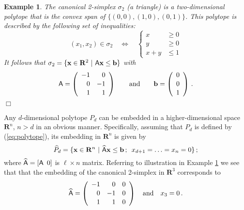 \documentclass[pdf,12pt,relaxed]{SANDreport}
\newtheorem{exam}{Example}
\begin{document}
    \begin{exam}\label{ex:2simplex}
    \emph{
    The canonical 2-simplex $\sigma_2$ (a triangle) is a two-dimensional polytope that is the convex span of $\{(0,0), (1,0), (0,1)\}$.  This polytope is described by the following set of inequalities:
    $$
    (x_1,x_2) \in \sigma_2 \quad\Leftrightarrow\quad
    \left\{\begin{array}{rl} x & \ge 0 \\[0.25ex] y& \ge 0 \\[0.25ex] x+y & \le  1 \end{array}\right. 
    $$
    It follows that
    $
    \sigma_2 = \{{\bf x}\in {\bf R}^2 \,\,|\,\, {\sf A}{\bf x} \le {\bf b} \}
    $
    with
    $$
    {\sf A} = \left(\begin{array}{rr} -1&0 \\[0.25ex] 0& -1\\[0.25ex] 1& 1 \end{array}\right)
    \qquad\mbox{and}\qquad
    {\bf b} = \left(\begin{array}{c} 0\\[0.25ex] 0 \\[0.25ex] 1\end{array}\right) \,.
    $$
    }%
    \hfill$\Box$
    \end{exam}
    
       
     Any $d$-dimensional polytope $P_d$ can be embedded in a higher-dimensional space $\mathbf{R}^n$, $n>d$ in an obvious manner. Specifically, assuming that $P_d$ is defined by (\ref{eq:polytope}), its embedding in $\mathbf{R}^n$ is given by
    \begin{equation}\label{eq:polytope-ext}
    \widehat{P}_d = \{ {\bf x}\in{\mathbf R}^n\,\,|\,\, \widehat{\sf A}{\bf x} \le  {\bf b}\,;\,\,\,  x_{d+1} =\ldots=x_n = 0 \}\,;
    \end{equation}
    where $\widehat{\sf A} = \left[{\sf A} \,\,\, 0\right]$ is $\ell\times n$ matrix. Referring to illustration in Example \ref{ex:2simplex} we see that that the embedding of the canonical 2-simplex in $\mathbf{R}^3$ corresponds to 
    \begin{equation}\label{eq:exmat}
    \widehat{\sf A} = \left(\begin{array}{rrr} -1&0&0 \\[0.25ex] 0&-1&0\\[0.25ex] 1& 1&0 \end{array}\right)
    \quad\mbox{and}\quad x_3 = 0 \,.
    \end{equation}
    
\end{document}
